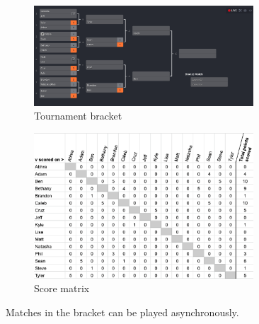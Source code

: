 \documentclass[letterpaper, 10 pt, conference]{ieeeconf}  %
\begin{document}
\begin{figure}[hb]
        \centering
        \begin{subfigure}[h]{0.4\textwidth}
                \centering
                \includegraphics[width=0.9\textwidth]{fig/singles-bracket_3.png}
                \caption{Tournament bracket}
        \end{subfigure}
        \begin{subfigure}[h]{0.4\textwidth}
                \centering
                \includegraphics[width=0.9\textwidth]{fig/score-matrix_3.png}
                \caption{Score matrix}
        \end{subfigure}
        \caption{Matches in the bracket can be played asynchronously.}
\end{figure}
\end{document}
